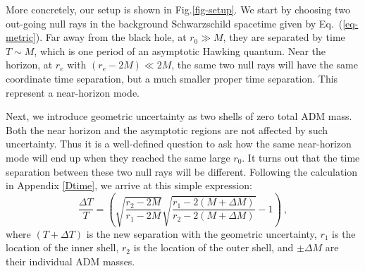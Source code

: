 \documentclass[aps,showpacs,onecolumn,floats,prd,superscriptaddress,nofootinbib]{revtex4-1}
\begin{document}
More concretely, our setup is shown in Fig.\ref{fig-setup}. 
We start by choosing two out-going null rays in the background Schwarzschild spacetime given by Eq.~(\ref{eq-metric}).
Far away from the black hole, at $r_0\gg M$, they are separated by time $T \sim M$, which is one period of an asymptotic Hawking quantum.
Near the horizon, at $r_e$ with $(r_e-2M)\ll 2M$, the same two null rays will have the same coordinate time separation, but a much smaller proper time separation.
This represent a near-horizon mode.

Next, we introduce geometric uncertainty as two shells of zero total ADM mass.
Both the near horizon and the asymptotic regions are not affected by such uncertainty.
Thus it is a well-defined question to ask how the same near-horizon mode will end up when they reached the same large $r_0$. 
It turns out that the time separation between these two null rays will be different. 
Following the calculation in Appendix \ref{Dtime}, we arrive at this simple expression:
\begin{equation}
\frac{\Delta T}{T} = 
\left(\sqrt{\frac{r_2-2M}{r_1-2M}}\sqrt{\frac{r_1-2(M+\Delta M)}{r_2-2(M+\Delta M)}}-1\right)~,
\label{eq-result}
\end{equation}
where $(T+\Delta T)$ is the new separation with the geometric uncertainty, $r_1$ is the location of the inner shell, $r_2$ is the location of the outer shell, and $\pm\Delta M$ are their individual ADM masses. 
\end{document}
